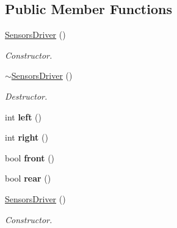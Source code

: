 \subsection*{Public Member Functions}
\begin{DoxyCompactItemize}
\item 
\mbox{\label{classSensorsDriver_a3da0016428e39e04021a7398ddec6cd7}} 
\hyperlink{classSensorsDriver_a3da0016428e39e04021a7398ddec6cd7}{Sensors\+Driver} ()
\begin{DoxyCompactList}\small\item\em Constructor. \end{DoxyCompactList}\item 
\mbox{\label{classSensorsDriver_aeb5bb8554d3bacd1cc267eedc2a8fb4d}} 
\hyperlink{classSensorsDriver_aeb5bb8554d3bacd1cc267eedc2a8fb4d}{$\sim$\+Sensors\+Driver} ()
\begin{DoxyCompactList}\small\item\em Destructor. \end{DoxyCompactList}\item 
\mbox{\label{classSensorsDriver_a6fac1b0c48090edc3cca9e1cc907341e}} 
int {\bfseries left} ()
\item 
\mbox{\label{classSensorsDriver_a984ed4ac35a526d868bcc42cf392dc95}} 
int {\bfseries right} ()
\item 
\mbox{\label{classSensorsDriver_a11fca6a33bae3fee8cb3c2a9ac28ebe5}} 
bool {\bfseries front} ()
\item 
\mbox{\label{classSensorsDriver_a659fa7e3854e245cb49f6ad6f2590404}} 
bool {\bfseries rear} ()
\item 
\mbox{\label{classSensorsDriver_a3da0016428e39e04021a7398ddec6cd7}} 
\hyperlink{classSensorsDriver_a3da0016428e39e04021a7398ddec6cd7}{Sensors\+Driver} ()
\begin{DoxyCompactList}\small\item\em Constructor. \end{DoxyCompactList}\item 
\mbox{\label{classSensorsDriver_aeb5bb8554d3bacd1cc267eedc2a8fb4d}} 

\end{DoxyCompactItemize}
